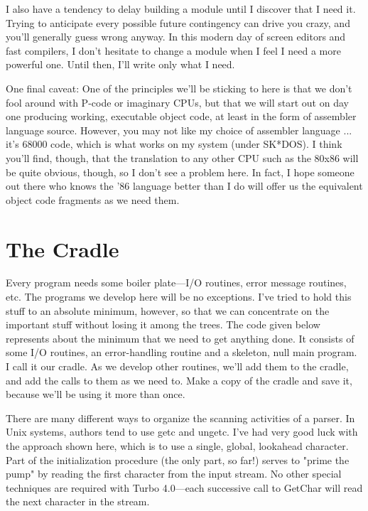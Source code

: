 \documentclass[float=false, crop=false]{standalone}
\begin{document}
I also have a tendency to delay building a module until I discover that I need
it. Trying to anticipate every possible future contingency can drive you crazy,
and you'll generally guess wrong anyway. In this modern day of screen editors
and fast compilers, I don't hesitate to change a module when I feel I need a
more powerful one. Until then, I'll write only what I need.

One final caveat: One of the principles we'll be sticking to here is that we
don't fool around with P-code or imaginary CPUs, but that we will start out on
day one producing working, executable object code, at least in the form of
assembler language source. However, you may not like my choice of assembler
language ... it's 68000 code, which is what works on my system (under SK*DOS). I
think you'll find, though, that the translation to any other CPU such as the
80x86 will be quite obvious, though, so I don't see a problem here. In fact, I
hope someone out there who knows the '86 language better than I do will offer us
the equivalent object code fragments as we need them.

\section{The Cradle}

Every program needs some boiler plate---I/O routines, error message routines,
etc. The programs we develop here will be no exceptions. I've tried to hold this
stuff to an absolute minimum, however, so that we can concentrate on the
important stuff without losing it among the trees. The code given below
represents about the minimum that we need to get anything done. It consists of
some I/O routines, an error-handling routine and a skeleton, null main program.
I call it our cradle. As we develop other routines, we'll add them to the
cradle, and add the calls to them as we need to. Make a copy of the cradle and
save it, because we'll be using it more than once.

There are many different ways to organize the scanning activities of a parser.
In Unix systems, authors tend to use getc and ungetc. I've had very good luck
with the approach shown here, which is to use a single, global, lookahead
character. Part of the initialization procedure (the only part, so far!) serves
to "prime the pump" by reading the first character from the input stream. No
other special techniques are required with Turbo 4.0---each successive call to
GetChar will read the next character in the stream.
\end{document}
